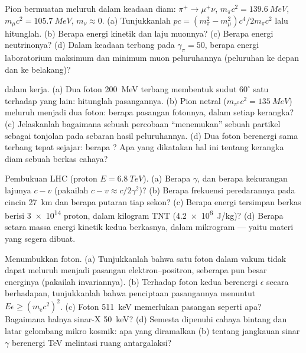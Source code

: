 \begin{exercise}[$\star\star$]\label{exo:b3:relativistic-dynamics:6}
Pion bermuatan meluruh dalam keadaan diam: $\pi^+ \to \mu^+\nu$, $m_\pi c^2 =
\qty{139.6}{MeV}$, $m_\mu c^2 = \qty{105.7}{MeV}$, $m_\nu \approx 0$.
(a) Tunjukkanlah $pc = (m_\pi^2 - m_\mu^2)c^4/2m_\pi c^2$ lalu hitunglah.
(b) Berapa energi kinetik dan laju muonnya? (c) Berapa energi
neutrinonya? (d) Dalam keadaan terbang pada $\gamma_\pi = 50$, berapa
energi laboratorium maksimum dan minimum muon peluruhannya (peluruhan ke
depan dan ke belakang)?
\end{exercise}

\begin{exercise}[$\star\star$]\label{exo:b3:relativistic-dynamics:7}
 dalam kerja. (a) Dua foton \qty{200}{MeV} terbang
membentuk sudut $60^\circ$ satu terhadap yang lain: hitunglah  pasangannya. (b) Pion netral ($m_{\pi^0}c^2 = \qty{135}{MeV}$)
meluruh menjadi dua foton: berapa  pasangan fotonnya,
dalam setiap kerangka? (c) Jelaskanlah bagaimana sebuah percobaan
``menemukan'' sebuah partikel sebagai tonjolan pada sebaran  hasil peluruhannya. (d) Dua foton berenergi sama terbang tepat
sejajar: berapa ? Apa yang dikatakan hal ini tentang
kerangka diam sebuah berkas cahaya?
\end{exercise}

\begin{exercise}[$\star\star$]\label{exo:b3:relativistic-dynamics:8}
Pembukuan LHC (proton $E = \qty{6.8}{TeV}$). (a) Berapa $\gamma$, dan
berapa kekurangan lajunya $c - v$ (pakailah $c - v \approx c/2\gamma^2$)?
(b) Berapa frekuensi peredarannya pada cincin \qty{27}{km} dan berapa
putaran tiap sekon? (c) Berapa energi tersimpan berkas berisi
\num{3e14} proton, dalam kilogram TNT (\qty{4.2e6}{J/kg})? (d) Berapa
setara massa energi kinetik kedua berkasnya, dalam mikrogram --- yaitu
materi yang segera dibuat.
\end{exercise}

\begin{exercise}[$\star\star$]\label{exo:b3:relativistic-dynamics:9}
Menumbukkan foton. (a) Tunjukkanlah bahwa satu foton dalam vakum tidak
dapat meluruh menjadi pasangan elektron--positron, seberapa pun besar
energinya (pakailah invariannya). (b) Terhadap foton kedua berenergi
$\epsilon$ secara berhadapan, tunjukkanlah bahwa penciptaan pasangannya
menuntut $E\epsilon \ge (m_{\text{e}}c^2)^2$. (c) Foton \qty{511}{keV}
memerlukan pasangan seperti apa? Bagaimana halnya sinar-X \qty{50}{keV}?
(d) Semesta dipenuhi cahaya bintang dan latar gelombang mikro kosmik:
apa yang diramalkan (b) tentang jangkauan sinar $\gamma$ berenergi TeV
melintasi ruang antargalaksi?
\end{exercise}

